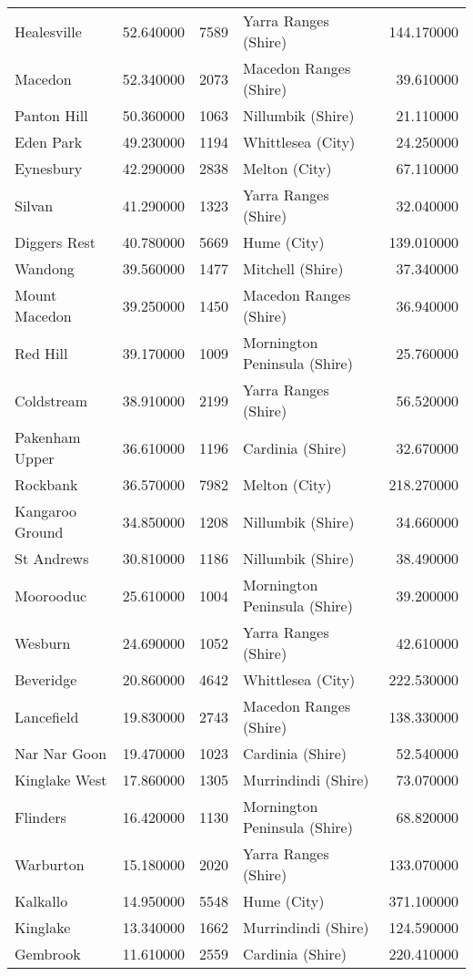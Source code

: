 \begin{longtable}{lrrlr}
Healesville & 52.640000 & 7589 & Yarra Ranges (Shire) & 144.170000 \\
Macedon & 52.340000 & 2073 & Macedon Ranges (Shire) & 39.610000 \\
Panton Hill & 50.360000 & 1063 & Nillumbik (Shire) & 21.110000 \\
Eden Park & 49.230000 & 1194 & Whittlesea (City) & 24.250000 \\
Eynesbury & 42.290000 & 2838 & Melton (City) & 67.110000 \\
Silvan & 41.290000 & 1323 & Yarra Ranges (Shire) & 32.040000 \\
Diggers Rest & 40.780000 & 5669 & Hume (City) & 139.010000 \\
Wandong & 39.560000 & 1477 & Mitchell (Shire) & 37.340000 \\
Mount Macedon & 39.250000 & 1450 & Macedon Ranges (Shire) & 36.940000 \\
Red Hill & 39.170000 & 1009 & Mornington Peninsula (Shire) & 25.760000 \\
Coldstream & 38.910000 & 2199 & Yarra Ranges (Shire) & 56.520000 \\
Pakenham Upper & 36.610000 & 1196 & Cardinia (Shire) & 32.670000 \\
Rockbank & 36.570000 & 7982 & Melton (City) & 218.270000 \\
Kangaroo Ground & 34.850000 & 1208 & Nillumbik (Shire) & 34.660000 \\
St Andrews & 30.810000 & 1186 & Nillumbik (Shire) & 38.490000 \\
Moorooduc & 25.610000 & 1004 & Mornington Peninsula (Shire) & 39.200000 \\
Wesburn & 24.690000 & 1052 & Yarra Ranges (Shire) & 42.610000 \\
Beveridge & 20.860000 & 4642 & Whittlesea (City) & 222.530000 \\
Lancefield & 19.830000 & 2743 & Macedon Ranges (Shire) & 138.330000 \\
Nar Nar Goon & 19.470000 & 1023 & Cardinia (Shire) & 52.540000 \\
Kinglake West & 17.860000 & 1305 & Murrindindi (Shire) & 73.070000 \\
Flinders & 16.420000 & 1130 & Mornington Peninsula (Shire) & 68.820000 \\
Warburton & 15.180000 & 2020 & Yarra Ranges (Shire) & 133.070000 \\
Kalkallo & 14.950000 & 5548 & Hume (City) & 371.100000 \\
Kinglake & 13.340000 & 1662 & Murrindindi (Shire) & 124.590000 \\
Gembrook & 11.610000 & 2559 & Cardinia (Shire) & 220.410000 \\
\end{longtable}
